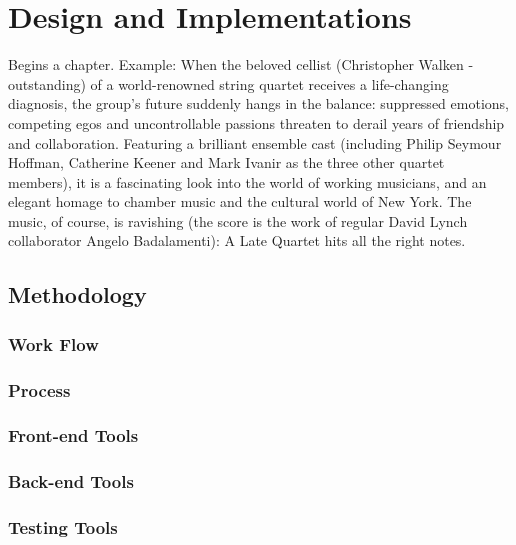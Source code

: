 %
%
\chapter{Design and Implementations}
\label{chap:D&I}

Begins a chapter. Example: When the beloved cellist (Christopher Walken - outstanding) of a world-renowned string quartet receives a life-changing diagnosis, the group's future suddenly hangs in the balance: suppressed emotions, competing egos and uncontrollable passions threaten to derail years of friendship and collaboration. Featuring a brilliant ensemble cast (including Philip Seymour Hoffman, Catherine Keener and Mark Ivanir as the three other quartet members), it is a fascinating look into the world of working musicians, and an elegant homage to chamber music and the cultural world of New York. The music, of course, is ravishing (the score is the work of regular David Lynch collaborator Angelo Badalamenti): A Late Quartet hits all the right notes.

\section{Methodology}
\label{sec:sec01}

\subsection{Work Flow}
\label{subsec:subsec01}

\subsection{Process}
\label{subsec:subsec02}

\subsection{Front-end Tools}
\label{subsec:subsec03}

\subsection{Back-end Tools}
\label{subsec:subsec04}

\subsection{Testing Tools}
\label{subsec:subsec05}

